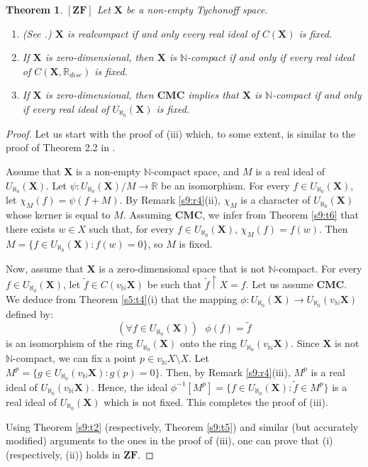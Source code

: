 \documentclass[12pt,twoside,leqno]{article}
\theoremstyle{plain}
\newtheorem{theorem}{Theorem}[section]
\theoremstyle{definition}
\theoremstyle{remark}
\begin{document}
\begin{theorem}
	\label{s9:t8}
	$[\mathbf{ZF}]$
	Let $\mathbf{X}$ be a non-empty Tychonoff space.
	\begin{enumerate} 
		\item[(i)] (See \cite{com}.) $\mathbf{X}$ is realcompact if and only  every real ideal of $C(\mathbf{X})$ is fixed.
		\item[(ii)] If $\mathbf{X}$ is zero-dimensional, then $\mathbf{X}$ is $\mathbb{N}$-compact if and only if every real ideal of $C(\mathbf{X}, \mathbb{R}_{disc})$ is fixed.
		\item[(iii)] If $\mathbf{X}$ is zero-dimensional, then $\mathbf{CMC}$ implies that $\mathbf{X}$ is $\mathbb{N}$-compact if and only if every real ideal of $U_{\aleph_0}(\mathbf{X})$ is fixed.
	\end{enumerate}
\end{theorem}
\begin{proof}
	Let us start with the proof of (iii) which, to some extent, is similar to the proof of Theorem 2.2 in \cite{ol}.
	
	Assume that $\mathbf{X}$ is a non-empty $\mathbb{N}$-compact space, and $M$ is a real ideal of $U_{\aleph_0}(\mathbf{X})$. Let $\psi: U_{\aleph_0}(\mathbf{X})/M\to\mathbb{R}$ be an isomorphism. For every $f\in U_{\aleph_0}(\mathbf{X})$, let $\chi_M(f)=\psi(f+M)$. By Remark \ref{s9:r4}(ii), $\chi_M$ is a character of $U_{\aleph_0}(\mathbf{X})$ whose kerner is equal to $M$. Assuming $\mathbf{CMC}$, we infer from Theorem \ref{s9:t6} that there exists $w\in X$ such that, for every $f\in U_{\aleph_0}(\mathbf{X})$, $\chi_M(f)=f(w)$. Then $M=\{f\in U_{\aleph_0}(\mathbf{X}): f(w)=0\}$, so $M$ is fixed.
	
	Now, assume that $\mathbf{X}$ is a zero-dimensional space that is not $\mathbb{N}$-compact. For every $f\in U_{\aleph_0}(\mathbf{X})$, let $\tilde{f}\in C(v_{\mathbb{N}}\mathbf{X})$ be such that $\tilde{f}\upharpoonright X=f$. Let us assume $\mathbf{CMC}$. We deduce from Theorem \ref{s5:t4}(i) that the mapping $\phi: U_{\aleph_0}(\mathbf{X})\to U_{\aleph_0}(v_{\mathbb{N}}\mathbf{X})$ defined by:
	$$ (\forall f\in U_{\aleph_0}(\mathbf{X}))\text{ } \phi(f)=\tilde{f}$$
	is an isomorphism of the ring $U_{\aleph_0}(\mathbf{X})$ onto the ring $U_{\aleph_0}(v_{\mathbb{N}}\mathbf{X})$. Since $\mathbf{X}$ is not $\mathbb{N}$-compact, we can fix a point $p\in v_{\mathbb{N}}X\setminus X$. Let $M^{p}=\{g\in U_{\aleph_0}(v_{\mathbb{N}}\mathbf{X}): g(p)=0\}$. Then, by Remark \ref{s9:r4}(iii), $M^p$ is a real ideal of  $U_{\aleph_0}(v_{\mathbb{N}}\mathbf{X})$. Hence, the ideal $\phi^{-1}[M^p]=\{f\in U_{\aleph_0}(\mathbf{X}): \tilde{f}\in M^p\}$ is a real ideal of $U_{\aleph_0}(\mathbf{X})$ which is not fixed. This completes the proof of (iii). 
	
	Using Theorem \ref{s9:t2} (respectively, Theorem \ref{s9:t5}) and similar (but accurately modified) arguments to the ones in the proof of (iii), one can prove that (i) (respectively, (ii)) holds in $\mathbf{ZF}$. 
\end{proof}
\end{document}
